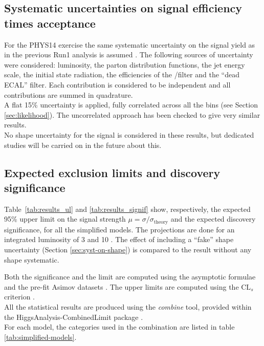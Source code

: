 \subsection{Systematic uncertainties on signal efficiency times acceptance}
\label{sec:sig-syst}

For the PHYS14 exercise the same systematic uncertainty on the signal yield 
as in the previous Run1 analysis is assumed \cite{CMS_AN_2013-366}. 
The following sources of uncertainty were considered: 
luminosity, the parton distribution
functions, the jet energy scale, the initial state radiation, the
efficiencies of the \mht/\met filter and the ``dead ECAL'' filter. 
Each contribution is considered to be independent and all contributions are
summed in quadrature. \\
A flat 15\% uncertainty is applied, fully correlated across all the bins (see Section \ref{sec:likelihood}). 
The uncorrelated approach has been checked to give very similar results. \\
No shape uncertainty for the signal is considered in these results, 
but dedicated studies will be carried on in the future about this.


\subsection{Expected exclusion limits and discovery significance}
\label{subsec:susy_results}

Table~\ref{tab:results_ul} and \ref{tab:results_signif} show, respectively, 
the expected 95\% upper limit on the signal strength $\mu=\sigma/\sigma_{\mathrm{theory}}$ 
and the expected discovery significance, for all the simplified models. 
The projections are done for an integrated luminosity of 3 and 10 \ifb. 
The effect of including a ``fake'' shape uncertainty (Section \ref{sec:syst-on-shape}) is compared to the result without any shape systematic.  

Both the significance and the limit are computed using the asymptotic formulae and the pre-fit Asimov datasets \cite{AsymptoticFormulae}. 
The upper limits are computed using the $\text{CL}_{s}$ criterion \cite{CLsTechnique}. \\
All the statistical results are produced using the \textit{combine} tool, 
provided within the HiggsAnalysis-CombinedLimit package \cite{Combine}. \\
For each model, the categories used in the combination are listed in table \ref{tab:simplified-models}. 

